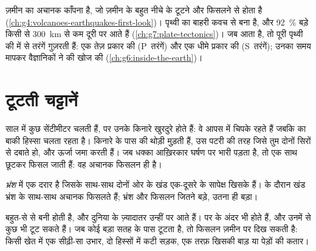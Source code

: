 \begin{recall}
\emph{} ज़मीन का अचानक काँपना है, जो ज़मीन के बहुत नीचे  के टूटने और
फिसलने से होता है (\cref{ch:g4:volcanoes-earthquakes-first-look})। पृथ्वी का
बाहरी कवच  से बना है, और 92~\% बड़े  किसी  से
\qty{300}{km} से कम दूरी पर आते हैं (\cref{ch:g7:plate-tectonics})। जब  आता
है, तो पूरी पृथ्वी की  में से तरंगें गुज़रती हैं: एक तेज़ प्रकार की
(P~तरंगें) और एक धीमे प्रकार की (S~तरंगें); उनका समय मापकर वैज्ञानिकों ने 
की खोज की
(\cref{ch:g6:inside-the-earth})।
\end{recall}

\section{टूटती चट्टानें}

 साल में कुछ सेंटीमीटर चलती हैं, पर उनके किनारे खुरदुरे होते हैं: वे आपस में
चिपके रहते हैं जबकि  का बाकी हिस्सा चलता रहता है। किनारे के पास की 
थोड़ी मुड़ती हैं, उस पटरी की तरह जिसे तुम दोनों सिरों से दबाते हो, और ऊर्जा जमा
करती हैं। जब धक्का आख़िरकार घर्षण पर भारी पड़ता है, तो  एक साथ छूटकर
फिसल जाती हैं: वह अचानक फिसलन ही  है।

\begin{definition}[भ्रंश]\label{def:g7:earthquakes:fault}
\emph{भ्रंश}  में एक दरार है जिसके साथ-साथ दोनों ओर के खंड
एक-दूसरे के सापेक्ष खिसके हैं।  के दौरान खंड भ्रंश के साथ-साथ अचानक फिसलते
हैं; भ्रंश और फिसलन जितने बड़े,  उतना ही
बड़ा।
\end{definition}

 बहुत-से  से बनी होती है, और दुनिया के ज़्यादातर  उन्हीं पर
आते हैं। पर   के अंदर भी होते हैं, और उनमें से कुछ भी टूट सकते हैं। जब
कोई बड़ा  सतह के पास टूटता है, तो फिसलन ज़मीन पर दिख सकती है: किसी खेत में एक
सीढ़ी-सा उभार, दो हिस्सों में कटी सड़क, एक तरफ़ खिसकी बाड़ या पेड़ों की
कतार।


